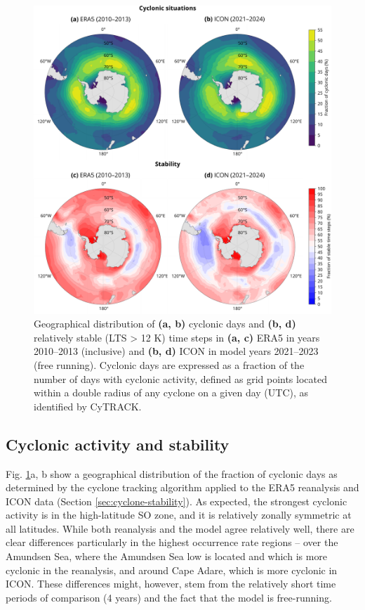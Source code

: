 \documentclass[12pt,a4paper]{article}
\begin{document}
\begin{figure}[p!]
\centering
\includegraphics[width=\textwidth]{img/cyc_stab_dist.pdf}
\caption{
Geographical distribution of \textbf{(a, b)} cyclonic days and \textbf{(b, d)}
relatively stable (LTS > 12 K) time steps in \textbf{(a, c)} ERA5 in years
2010--2013 (inclusive) and \textbf{(b, d)} ICON in model years 2021--2023 (free
running). Cyclonic days are expressed as a fraction of the number of days with
cyclonic activity, defined as grid points located within a double radius of any
cyclone on a given day (UTC), as identified by CyTRACK.
}
\label{fig:cyclone-stability}
\end{figure}

\subsection{Cyclonic activity and stability}

Fig. \ref{fig:cyclone-stability}a, b show a geographical distribution of the fraction
of cyclonic days as determined by the cyclone tracking algorithm applied to the
ERA5 reanalysis and ICON data (Section \ref{sec:cyclone-stability}). As
expected, the strongest cyclonic activity is in the high-latitude SO zone, and
it is relatively zonally symmetric at all latitudes.  While both reanalysis and
the model agree relatively well, there are clear differences particularly in the highest occurrence rate regions -- over the Amundsen Sea, where the Amundsen Sea low is located \cite{turner2013} and which is
more cyclonic in the reanalysis, and around Cape Adare, which is more cyclonic
in ICON. These differences might, however, stem from the relatively short time
periods of comparison (4 years) and the fact that the model is free-running.
\end{document}
